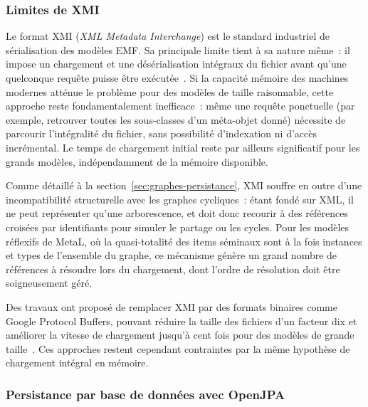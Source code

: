 \subsubsection{Limites de XMI}
\label{sec:limites-xmi}

Le format XMI (\textit{XML Metadata Interchange}) est le standard industriel de sérialisation des modèles EMF. Sa principale limite tient à sa nature même~: il impose un chargement et une désérialisation intégraux du fichier avant qu'une quelconque requête puisse être exécutée~\cite{steinberg2008emf}. Si la capacité mémoire des machines modernes atténue le problème pour des modèles de taille raisonnable, cette approche reste fondamentalement inefficace~: même une requête ponctuelle (par exemple, retrouver toutes les sous-classes d'un méta-objet donné) nécessite de parcourir l'intégralité du fichier, sans possibilité d'indexation ni d'accès incrémental. Le temps de chargement initial reste par ailleurs significatif pour les grands modèles, indépendamment de la mémoire disponible.

Comme détaillé à la section~\ref{sec:graphes-persistance}, XMI souffre en outre d'une incompatibilité structurelle avec les graphes cycliques~: étant fondé sur XML, il ne peut représenter qu'une arborescence, et doit donc recourir à des références croisées par identifiants pour simuler le partage ou les cycles. Pour les modèles réflexifs de MetaL, où la quasi-totalité des items séminaux sont à la fois instances et types de l'ensemble du graphe, ce mécanisme génère un grand nombre de références à résoudre lors du chargement, dont l'ordre de résolution doit être soigneusement géré.

Des travaux ont proposé de remplacer XMI par des formats binaires comme Google Protocol Buffers, pouvant réduire la taille des fichiers d'un facteur dix et améliorer la vitesse de chargement jusqu'à cent fois pour des modèles de grande taille~\cite{protobuf}. Ces approches restent cependant contraintes par la même hypothèse de chargement intégral en mémoire.

\subsubsection{Persistance par base de données avec OpenJPA}
\label{sec:persistance-openjpa}

